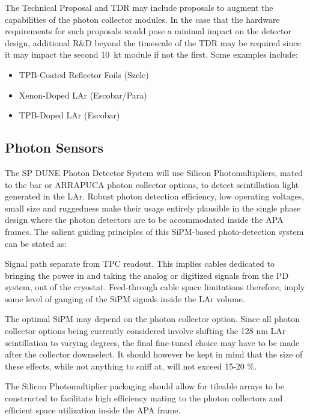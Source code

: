 The Technical Proposal and TDR may include proposals to augment the capabilities of the photon
collector modules. In the case that the hardware requirements for such proposals would pose a minimal
impact on the detector design, additional R\&D beyond the timescale of the TDR may be required since it may impact the second 10~kt module if not the first. 
Some examples include:
\begin{itemize}
\item TPB-Coated Reflector Foils (Szelc)
\item Xenon-Doped LAr (Escobar/Para)
\item TPB-Doped LAr (Escobar)
\end{itemize}

\subsection{Photon Sensors}
\label{sec:fdsp-pd-ps}
The SP DUNE Photon Detector System will use Silicon Photomultipliers, mated to
the bar or ARRAPUCA photon collector options, to detect
scintillation light generated in the LAr. Robust photon detection efficiency, low operating
voltages, small size and ruggedness make their usage entirely plausible in the single
phase design where the photon detectors are to be accommodated inside the APA 
frames. The salient guiding principles of this SiPM-based photo-detection system can be stated
as:

Signal path separate from TPC readout. This implies cables dedicated to bringing the power
in and taking the analog or digitized signals from the PD system, out of the cryostat. 
Feed-through cable space limitations therefore, imply some level of ganging of the SiPM
signals inside the LAr volume. 

The optimal SiPM may depend on the photon collector option. Since all photon collector
options being currently considered involve shifting the 128 nm LAr scintillation to 
varying degrees, the final fine-tuned choice may have to be made after the collector
downselect. It should however be kept in mind that the size of these effects, while not 
anything to sniff at, will not exceed 15-20 $\%$.

The Silicon Photomultiplier packaging should allow for tileable arrays to be constructed to
facilitate high efficiency mating to the photon collectors and efficient space utilization inside
the APA frame.

